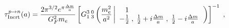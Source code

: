 \begin{equation} 
{\tau}^{p  \to n}_{\rm Inert} (a) 
= 
\frac{2 \pi^{3/2} e^{\pi \frac{{\Delta m}}{a}}}{G_F^2  m_e } 
\left[ 
G_{1\;3}^{3\;0} 
\left( \frac{m_e^2}{a^2} \left| 
\begin{array}{l} 
\;\;\;1\\ 
-\frac{1}{2}\;,\;\frac{1}{2}+i \frac{\Delta m}{a}\;,\;\frac{1}{2}-i \frac{\Delta m}{a} 
\end{array} 
\right. 
\right) 
\right]^{-1} \; , 
\label{TIF} 
\end{equation} 
